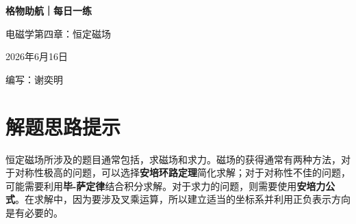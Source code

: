\documentclass[11pt,a4paper]{ctexart}
\begin{document}
\begin{center}
  {\Large\bfseries\color{mainblue} 格物助航｜每日一练}\par
  \vspace{0.25em}
  {\large 电磁学第四章：恒定磁场}\par
  \vspace{0.35em}
  {\small 2026年6月16日}\par
  \vspace{0.35em}
  {\small 编写：谢奕明}
\end{center}

\vspace{-0.3em}

\section*{解题思路提示}
\begin{tipBox}
恒定磁场所涉及的题目通常包括，求磁场和求力。磁场的获得通常有两种方法，对于对称性极高的问题，可以选择\textbf{安培环路定理}简化求解；对于对称性不佳的问题，可能需要利用\textbf{毕-萨定律}结合积分求解。对于求力的问题，则需要使用\textbf{安培力公式}。在求解中，因为要涉及叉乘运算，所以建立适当的坐标系并利用正负表示方向是有必要的。
\end{tipBox}
\end{document}
